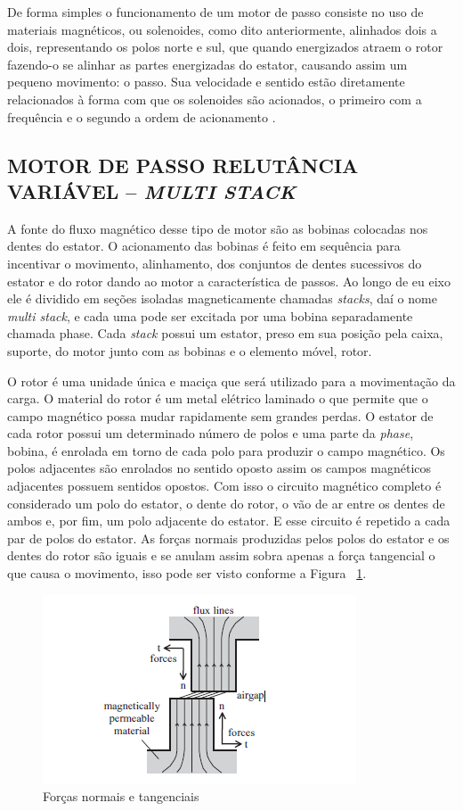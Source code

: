 De forma simples o funcionamento de um motor de passo consiste no uso de materiais magnéticos, ou solenoides, como dito anteriormente, alinhados dois a dois, representando os polos norte e sul, que quando energizados atraem o rotor fazendo-o se alinhar as partes energizadas do estator, causando assim um pequeno movimento: o passo. Sua velocidade e sentido estão diretamente relacionados à forma com que os solenoides são acionados, o primeiro com a frequência e o segundo a ordem de acionamento \cite{demotor, acarnley2002stepping,wikipedia2012stepper}.

\subsection{MOTOR DE PASSO RELUTÂNCIA VARIÁVEL – \emph{MULTI STACK}}
A fonte do fluxo magnético desse tipo de motor são as bobinas colocadas nos dentes do estator. O acionamento das bobinas é feito em sequência para incentivar o movimento, alinhamento, dos conjuntos de dentes sucessivos do estator e do rotor dando ao motor a característica de passos. Ao longo de eu eixo ele é dividido em seções isoladas magneticamente chamadas \emph{stacks}, daí o nome \emph{multi stack}, e cada uma pode ser excitada por uma bobina separadamente chamada phase. Cada \emph{stack} possui um estator, preso em sua posição pela caixa, suporte, do motor junto com as bobinas e o elemento móvel, rotor.

O rotor é uma unidade única e maciça que será utilizado para a movimentação da carga. O material do rotor é um metal elétrico laminado o que permite que o campo magnético possa mudar rapidamente sem grandes perdas. O estator de cada rotor possui um determinado número de polos e uma parte da \emph{phase}, bobina, é enrolada em torno de cada polo para produzir o campo magnético. Os polos adjacentes são enrolados no sentido oposto assim os campos magnéticos adjacentes possuem sentidos opostos. Com isso o circuito magnético completo é considerado um polo do estator, o dente do rotor, o vão de ar entre os dentes de ambos e, por fim, um polo adjacente do estator. E esse circuito é repetido a cada par de polos do estator. As forças normais produzidas pelos polos do estator e os dentes do rotor são iguais e se anulam assim sobra apenas a força tangencial o que causa o movimento, isso pode ser visto conforme a Figura ~\ref{fig:forcamotorpassobainfusao}.

\begin{figure}[htp]
	\centering
	\includegraphics[scale=1]{images/forca_motor_passo.png}
	\caption{Forças normais e tangenciais}	
	\label{fig:forcamotorpassobainfusao}	
\end{figure}

